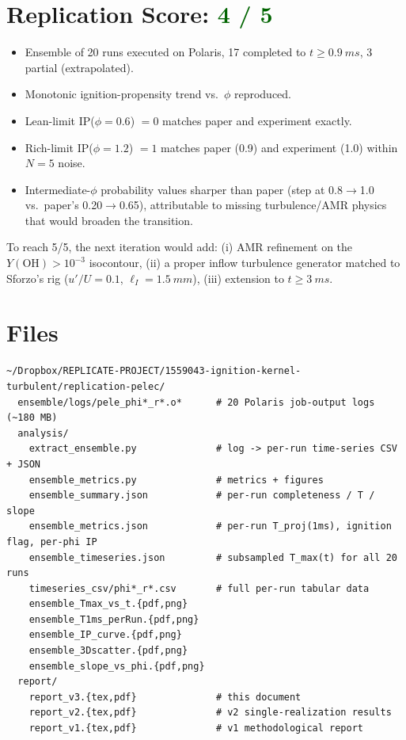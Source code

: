 \documentclass[11pt,a4paper]{article}
\begin{document}
\section{Replication Score: \textcolor{darkgreen}{4 / 5}}
\begin{itemize}[leftmargin=*]
\item[\textcolor{darkgreen}{\checkmark}] Ensemble of 20 runs executed on Polaris, 17 completed to $t\geq \SI{0.9}{ms}$, 3 partial (extrapolated).
\item[\textcolor{darkgreen}{\checkmark}] Monotonic ignition-propensity trend vs.\ $\phi$ reproduced.
\item[\textcolor{darkgreen}{\checkmark}] Lean-limit IP($\phi{=}0.6$) $=0$ matches paper and experiment exactly.
\item[\textcolor{darkgreen}{\checkmark}] Rich-limit IP($\phi{=}1.2$) $=1$ matches paper (0.9) and experiment (1.0) within $N{=}5$ noise.
\item[\textcolor{oursred}{\xmark}] Intermediate-$\phi$ probability values sharper than paper (step at 0.8$\to$1.0 vs.\ paper's 0.20$\to$0.65), attributable to missing turbulence/AMR physics that would broaden the transition.
\end{itemize}

To reach 5/5, the next iteration would add: (i) AMR refinement on the $Y(\mathrm{OH})>10^{-3}$
isocontour, (ii) a proper inflow turbulence generator matched to Sforzo's rig
($u'/U = 0.1$, $\ell_I = \SI{1.5}{mm}$), (iii) extension to $t \geq \SI{3}{ms}$.

\section{Files}
\begin{verbatim}
~/Dropbox/REPLICATE-PROJECT/1559043-ignition-kernel-turbulent/replication-pelec/
  ensemble/logs/pele_phi*_r*.o*      # 20 Polaris job-output logs (~180 MB)
  analysis/
    extract_ensemble.py              # log -> per-run time-series CSV + JSON
    ensemble_metrics.py              # metrics + figures
    ensemble_summary.json            # per-run completeness / T / slope
    ensemble_metrics.json            # per-run T_proj(1ms), ignition flag, per-phi IP
    ensemble_timeseries.json         # subsampled T_max(t) for all 20 runs
    timeseries_csv/phi*_r*.csv       # full per-run tabular data
    ensemble_Tmax_vs_t.{pdf,png}
    ensemble_T1ms_perRun.{pdf,png}
    ensemble_IP_curve.{pdf,png}
    ensemble_3Dscatter.{pdf,png}
    ensemble_slope_vs_phi.{pdf,png}
  report/
    report_v3.{tex,pdf}              # this document
    report_v2.{tex,pdf}              # v2 single-realization results
    report_v1.{tex,pdf}              # v1 methodological report
\end{verbatim}
\end{document}
